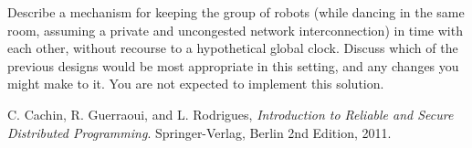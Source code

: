 \documentclass[a4paper]{article}
\begin{document}
Describe a mechanism for keeping the group of
robots (while dancing in the same room, assuming a private and uncongested
network interconnection) in time with each other, without recourse to a
hypothetical global clock. Discuss which of the previous designs would be most
appropriate in this setting, and any changes you might make to it.
You are not expected to implement this solution.



















\begin{thebibliography}{9}

  C. Cachin, R. Guerraoui, and L. Rodrigues,
  \emph{Introduction to Reliable and Secure Distributed Programming}.
  Springer-Verlag, Berlin
  2nd Edition,
  2011.

\end{thebibliography}
\end{document}
